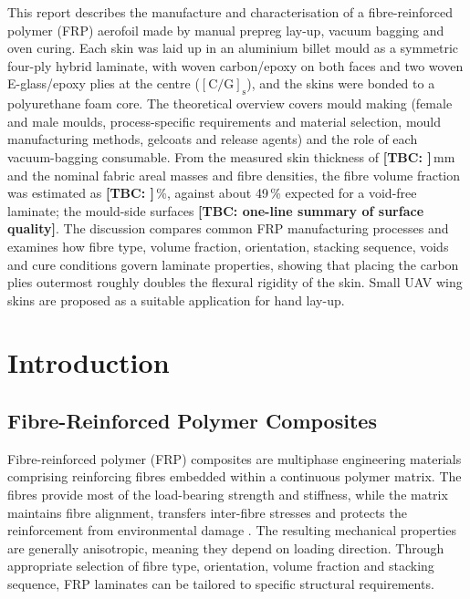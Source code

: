 \documentclass[11pt,a4paper]{article}
\newcommand{\added}[1]{\textcolor{addgreen}{#1}}
\newenvironment{addedblock}{\color{addgreen}}{}
\newcommand{\added}[1]{#1}
\newenvironment{addedblock}{}{}
\newcommand{\tbc}[1]{\added{\textbf{[TBC\if\relax\detokenize{#1}\relax\else: #1\fi]}}}
\begin{document}
\begin{addedblock}
This report describes the manufacture and characterisation of a
fibre-reinforced polymer (FRP) aerofoil made by manual prepreg lay-up,
vacuum bagging and oven curing. Each skin was laid up in an aluminium
billet mould as a symmetric four-ply hybrid laminate, with woven
carbon/epoxy on both faces and two woven E-glass/epoxy plies at the
centre ($[\mathrm{C}/\mathrm{G}]_\mathrm{s}$), and the skins were
bonded to a polyurethane foam core. The theoretical overview covers
mould making (female and male moulds, process-specific requirements
and material selection, mould manufacturing methods, gelcoats and
release agents) and the role of each vacuum-bagging consumable. From
the measured skin thickness of \tbc{}\,mm and the nominal fabric areal
masses and fibre densities, the fibre volume fraction was estimated as
\tbc{}\,\%, against about 49\,\% expected for a void-free laminate; the
mould-side surfaces \tbc{one-line summary of surface quality}. The
discussion compares common FRP manufacturing processes and examines
how fibre type, volume fraction, orientation, stacking sequence, voids
and cure conditions govern laminate properties, showing that placing
the carbon plies outermost roughly doubles the flexural rigidity of
the skin. Small UAV wing skins are proposed as a suitable application
for hand lay-up.
\end{addedblock}



\section{Introduction}

\subsection{Fibre-Reinforced Polymer Composites}

Fibre-reinforced polymer (FRP) composites are multiphase engineering
materials comprising reinforcing fibres embedded within a continuous
polymer matrix. The fibres provide most of the load-bearing strength
and stiffness, while the matrix maintains fibre alignment, transfers
inter-fibre stresses and protects the reinforcement from environmental
damage \citep{mallick2007}. The resulting mechanical properties are
generally anisotropic, meaning they depend on loading direction.
Through appropriate selection of fibre type, orientation, volume
fraction and stacking sequence, FRP laminates can be tailored to
specific structural requirements.
\end{document}
